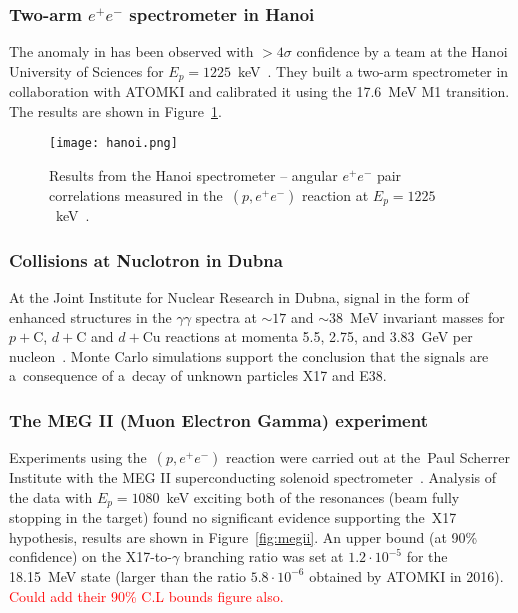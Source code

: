 			\subsubsection{Two-arm $e^+e^-$ spectrometer in Hanoi}
				The anomaly in  has been observed with $>4\sigma$ confidence by a team at the Hanoi University of Sciences for $E_p = 1225$~keV~\cite{hanoi}. They built a two\nobreakdash-arm spectrometer in collaboration with ATOMKI and calibrated it using the 17.6~MeV M1 transition. The results are shown in Figure~\ref{fig:hanoi}.
				
				\begin{figure}
					\centering
					\texttt{[image: hanoi.png]}
					\caption{Results from the Hanoi spectrometer -- angular $e^+e^-$ pair correlations measured in the~$(p,e^+e^-)$ reaction at $E_p = 1225$~keV~\cite{hanoi}.}
					\label{fig:hanoi}
				\end{figure}
			
			\subsubsection{Collisions at Nuclotron in Dubna}
				At the Joint Institute for Nuclear Research in Dubna, signal in the form of enhanced structures in the $\gamma\gamma$ spectra at $\sim 17$ and $\sim 38$~MeV invariant masses for $p+\mathrm{C}$, $d+\mathrm{C}$ and $d+\mathrm{Cu}$ reactions at momenta 5.5, 2.75, and 3.83~GeV per nucleon~\cite{dubna}. Monte Carlo simulations support the conclusion that the signals are a~consequence of a~decay of unknown particles X17 and E38.
				
			\subsubsection{The MEG II (Muon Electron Gamma) experiment}
				Experiments using the~$(p,e^+e^-)$ reaction were carried out at the~Paul Scherrer Institute with the MEG II superconducting solenoid spectrometer~\cite{megii}. Analysis of the data with $E_p = 1080$~keV exciting both of the resonances (beam fully stopping in the target) found no significant evidence supporting the~X17 hypothesis, results are shown in Figure~\ref{fig:megii}. An upper bound (at 90\% confidence) on the X17\nobreakdash-to\nobreakdash-$\gamma$ branching ratio was set at $1.2\cdot10^{-5}$ for the 18.15~MeV state (larger than the ratio $5.8\cdot10^{-6}$ obtained by ATOMKI in 2016). \textcolor{red}{Could add their 90\% C.L bounds figure also.}
				
